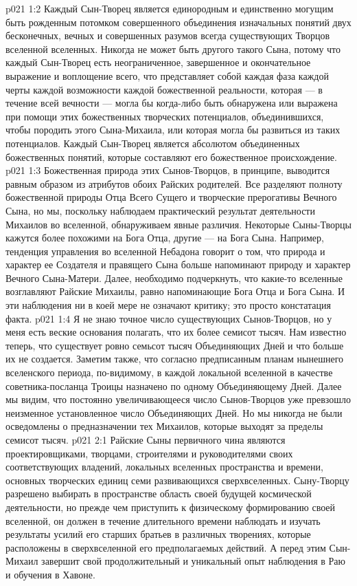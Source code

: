 \vs p021 1:2 Каждый Сын\hyp{}Творец является единородным и единственно могущим быть рожденным потомком совершенного объединения изначальных понятий двух бесконечных, вечных и совершенных разумов всегда существующих Творцов вселенной вселенных. Никогда не может быть другого такого Сына, потому что каждый Сын\hyp{}Творец есть неограниченное, завершенное и окончательное выражение и воплощение всего, что представляет собой каждая фаза каждой черты каждой возможности каждой божественной реальности, которая --- в течение всей вечности --- могла бы когда\hyp{}либо быть обнаружена или выражена при помощи этих божественных творческих потенциалов, объединившихся, чтобы породить этого Сына\hyp{}Михаила, или которая могла бы развиться из таких потенциалов. Каждый Сын\hyp{}Творец является абсолютом объединенных божественных понятий, которые составляют его божественное происхождение.
\vs p021 1:3 Божественная природа этих Сынов\hyp{}Творцов, в принципе, выводится равным образом из атрибутов обоих Райских родителей. Все разделяют полноту божественной природы Отца Всего Сущего и творческие прерогативы Вечного Сына, но мы, поскольку наблюдаем практический результат деятельности Михаилов во вселенной, обнаруживаем явные различия. Некоторые Сыны\hyp{}Творцы кажутся более похожими на Бога Отца, другие --- на Бога Сына. Например, тенденция управления во вселенной Небадона говорит о том, что природа и характер ее Создателя и правящего Сына больше напоминают природу и характер Вечного Сына\hyp{}Матери. Далее, необходимо подчеркнуть, что какие\hyp{}то вселенные возглавляют Райские Михаилы, равно напоминающие Бога Отца и Бога Сына. И эти наблюдения ни в коей мере не означают критику; это просто констатация факта.
\vs p021 1:4 Я не знаю точное число существующих Сынов\hyp{}Творцов, но у меня есть веские основания полагать, что их более семисот тысяч. Нам известно теперь, что существует ровно семьсот тысяч Объединяющих Дней и что больше их не создается. Заметим также, что согласно предписанным планам нынешнего вселенского периода, по\hyp{}видимому, в каждой локальной вселенной в качестве советника\hyp{}посланца Троицы назначено по одному Объединяющему Дней. Далее мы видим, что постоянно увеличивающееся число Сынов\hyp{}Творцов уже превзошло неизменное установленное число Объединяющих Дней. Но мы никогда не были осведомлены о предназначении тех Михаилов, которые выходят за пределы семисот тысяч.
\vs p021 2:1 Райские Сыны первичного чина являются проектировщиками, творцами, строителями и руководителями своих соответствующих владений, локальных вселенных пространства и времени, основных творческих единиц семи развивающихся сверхвселенных. Сыну\hyp{}Творцу разрешено выбирать в пространстве область своей будущей космической деятельности, но прежде чем приступить к физическому формированию своей вселенной, он должен в течение длительного времени наблюдать и изучать результаты усилий его старших братьев в различных творениях, которые расположены в сверхвселенной его предполагаемых действий. А перед этим Сын\hyp{}Михаил завершит свой продолжительный и уникальный опыт наблюдения в Раю и обучения в Хавоне.
